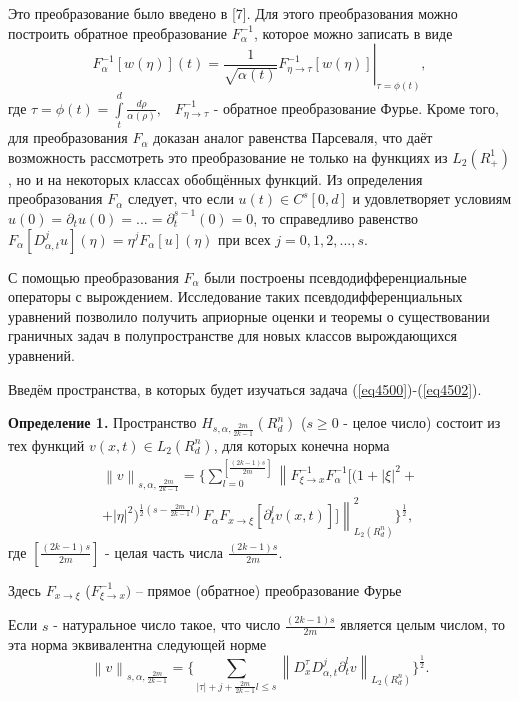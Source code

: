 Это преобразование было введено в [7]. Для этого преобразования можно
построить обратное преобразование $F_\alpha ^{ - 1} $, которое можно
записать в виде
$$F_\alpha ^{ - 1} [w(\eta )](t) = \left. {\frac{1}{\sqrt
{\alpha (t)} }F_{\eta \to \tau }^{ - 1} [w(\eta )]} \right|_{\tau = \phi
(t)} ,$$ где $\tau = \phi (t) = \int\limits_t^d {\frac{d\rho }{\alpha (\rho
)}} ,\,\,\,\,\,F_{\eta \to \tau }^{ - 1} $ - обратное преобразование Фурье.
Кроме того, для преобразования $F_\alpha $ доказан аналог равенства
Парсеваля, что даёт возможность рассмотреть это преобразование не только на
функциях из $L_2 (R_ + ^1 )$, но и на некоторых классах обобщённых функций.
Из определения преобразования $F_\alpha $ следует, что если $u\left( t
\right) \in C^s\left[ {0,d} \right]$ и удовлетворяет условиям $u\left( 0
\right) = \partial _t u\left( 0 \right) = ... = \partial _t^{s - 1} \left( 0
\right) = 0$,
то справедливо равенство $F_\alpha \left[ {D_{\alpha ,t}^j u} \right]\left(
\eta \right) = \eta ^jF_\alpha \left[ u \right]\left( \eta \right)$ при всех
$j = 0,1,2,...,s$.

С помощью преобразования $F_\alpha $ были построены псевдодифференциальные
операторы с вырождением. Исследование таких псевдодифференциальных уравнений
позволило получить априорные оценки и теоремы о существовании граничных
задач в полупространстве для новых классов вырождающихся уравнений.

Введём пространства, в которых будет изучаться задача (\ref{eq4500})-(\ref{eq4502}).

\textbf{Определение 1.} Пространство $H_{s,\alpha ,\frac{2m}{2k - 1}} (R_d^n
)$ ($s \ge 0$ - целое число) состоит из тех функций $v(x,t) \in L_2 (R_d^n
)$, для которых конечна норма
\begin{multline*}
	\left\| v \right\|_{s,\alpha ,\frac{2m}{2k - 1}} =
	\{
		\sum\limits_{l = 0}^{[\frac{(2k - 1)s}{2m}]}
		\left\|
			F_{\xi \to x}^{ - 1} F_\alpha ^{ - 1}
			[(1 + \left| \xi \right|^2 +
		\right. \\ + \left.
			\left| \eta \right|^2 )^{\frac{1}{2}(s -
			\frac{2m}{2k - 1}l)}F_\alpha F_{x \to \xi } [\partial _t^l v(x,t)]]
		\right\|_{L_2 (R_d^n )}^2
	\}
	^\frac{1}{2} ,
\end{multline*}
где $[\frac{(2k - 1)s}{2m}]$ - целая часть числа $\frac{(2k - 1)s}{2m}$.

Здесь $F_{x \to \xi } $ ($F_{\xi \to x}^{ - 1} )$ -- прямое (обратное)
преобразование Фурье

Если $s$ - натуральное число такое, что число $\frac{(2k - 1)s}{2m}$
является целым числом, то эта норма эквивалентна следующей норме
\[
\left\| v \right\|_{s,\alpha ,\frac{2m}{2k - 1}} = \{\sum\limits_{\left|
\tau \right| + j + \frac{2m}{2k - 1}l \le s} {\left\| {D_x^\tau D_{\alpha
,t}^j \partial _t^l v} \right\|} _{L_2 (R_d^n )} \}^{\frac{1}{2}}.
\]



